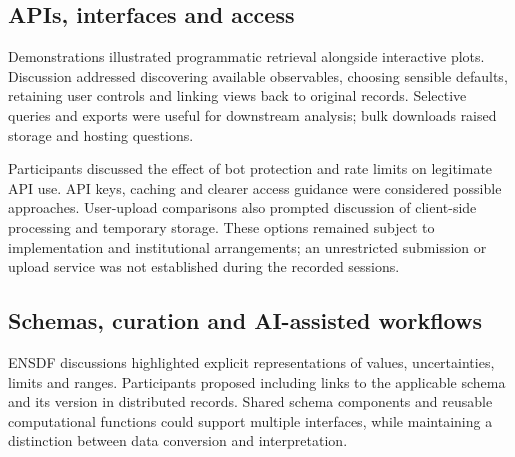 

\subsection{APIs, interfaces and access}
Demonstrations illustrated programmatic retrieval alongside interactive plots. Discussion addressed discovering available observables, choosing sensible defaults, retaining user controls and linking views back to original records. Selective queries and exports were useful for downstream analysis; bulk downloads raised storage and hosting questions.

Participants discussed the effect of bot protection and rate limits on legitimate API use. API keys, caching and clearer access guidance were considered possible approaches. User-upload comparisons also prompted discussion of client-side processing and temporary storage. These options remained subject to implementation and institutional arrangements; an unrestricted submission or upload service was not established during the recorded sessions.

\subsection{Schemas, curation and AI-assisted workflows}
ENSDF discussions highlighted explicit representations of values, uncertainties, limits and ranges. Participants proposed including links to the applicable schema and its version in distributed records. Shared schema components and reusable computational functions could support multiple interfaces, while maintaining a distinction between data conversion and interpretation.

